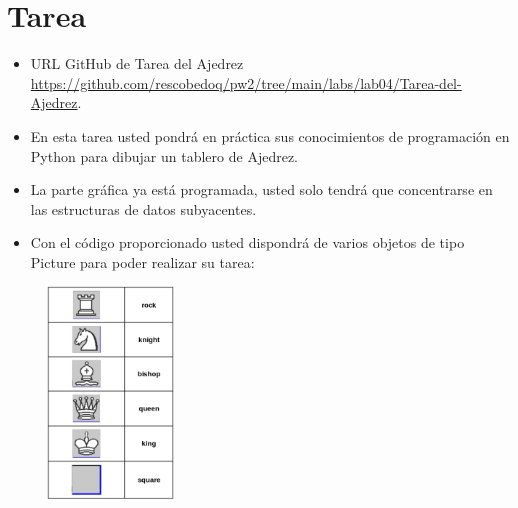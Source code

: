 \documentclass{article}
\begin{document}
	\section{Tarea}
	\begin{itemize}
		\item URL GitHub de Tarea del Ajedrez \url{https://github.com/rescobedoq/pw2/tree/main/labs/lab04/Tarea-del-Ajedrez}.
		\item En esta tarea usted pondrá en práctica sus conocimientos de programación en Python para dibujar un tablero de Ajedrez.
		\item La parte gráfica ya está programada, usted solo tendrá que concentrarse en las estructuras de datos subyacentes.
		\item Con el código proporcionado usted dispondrá de varios objetos de tipo Picture para poder realizar su tarea:
	\end{itemize}
	
	\begin{figure}[H]
		\centering
		\includegraphics[width=0.3\textwidth,keepaspectratio]{imagenes/picture.png}
	\end{figure}
	
\end{document}
